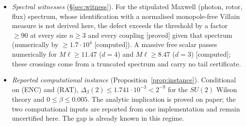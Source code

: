\documentclass[11pt,a4paper]{article}
\theoremstyle{plain}
\theoremstyle{definition}
\theoremstyle{remark}
\numberwithin{equation}{section}
\newcommand{\st}[1]{\textsf{[#1]}}
\begin{document}
\begin{itemize}
(flux sectors included) and a trace bound give an explicit sufficient inequality for the criterion at a fixed physical size; eventual
smallness as $\ell\to\infty$ needs control of the dependence of the trace bound on $\ell$. Examples~\ref{ex:copies} and~\ref{ex:z2} show that
neither the finite-volume gap nor the trace bound can be dropped.
\item \emph{Spectral witnesses} (\S\ref{sec:witness}). For the stipulated Maxwell (photon, rotor, flux) spectrum, whose identification
with a normalised monopole-free Villain measure is not derived here, the defect exceeds the threshold by a factor $\ge90$ at every size $n\ge3$
and every coupling \st{proved} given that spectrum (numerically by $\ge1.7\cdot10^4$ \st{computed}). A massive free scalar passes numerically
for $M\ell\ge11.47$ ($d=4$) and $M\ell\ge8.47$ ($d=3$) \st{computed}; these crossings come from a truncated spectrum and carry no tail
certificate.
\item \emph{Reported computational instance} (Proposition~\ref{prop:instance}). Conditional on (ENC) and (RAT), $\Delta_\beta(2)\le1.741\cdot10^{-3}<2^{-9}$ for the $SU(2)$ Wilson theory and $0\le\beta\le0.005$. The analytic implication is proved on paper; the two computational inputs are reported from one implementation and remain uncertified here. The gap is already known in this regime.
\end{itemize}
\end{document}
